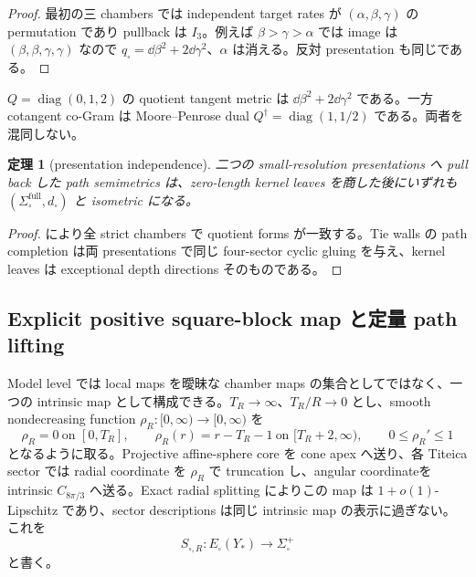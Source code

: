 \documentclass[11pt,a4paper]{ltjsarticle}
\newcommand{\Sigfull}{\Sigma_{\square}^{\mathrm{full}}}
\newcommand{\Sigplus}{\Sigma_{\square}^{+}}
\theoremstyle{plain}
\newtheorem{theorem}{定理}[section]\newtheorem{proposition}[theorem]{命題}
\theoremstyle{definition}
\theoremstyle{remark}
\begin{document}
\begin{proof}
最初の三 chambers では independent target rates が $(\alpha,\beta,\gamma)$ の permutation であり pullback は $I_3$。例えば $\beta>\gamma>\alpha$ では image は $(\beta,\beta,\gamma,\gamma)$ なので $q_{\square}=\dd\beta^2+2\dd\gamma^2$、$\alpha$ は消える。反対 presentation も同じである。
\end{proof}

\begin{warning}
$Q=\operatorname{diag}(0,1,2)$ の quotient tangent metric は $\dd\beta^2+2\dd\gamma^2$ である。一方 cotangent co-Gram は Moore--Penrose dual $Q^\dagger=\operatorname{diag}(1,1/2)$ である。両者を混同しない。
\end{warning}

\begin{theorem}[presentation independence]\label{thm:presentation-independence}
二つの small-resolution presentations へ pull back した path semimetrics は、zero-length kernel leaves を商した後にいずれも $(\Sigfull,d_{\square})$ と isometric になる。
\end{theorem}

\begin{proof}
 により全 strict chambers で quotient forms が一致する。Tie walls の path completion は両 presentations で同じ four-sector cyclic gluing を与え、kernel leaves は exceptional depth directions そのものである。
\end{proof}

\subsection{Explicit positive square-block map と定量 path lifting}
Model level では local maps を曖昧な chamber maps の集合としてではなく、一つの intrinsic map として構成できる。$T_R\to\infty$、$T_R/R\to0$ とし、smooth nondecreasing function $\rho_R:[0,\infty)\to[0,\infty)$ を
\[
 \rho_R=0\ \text{on }[0,T_R],
 \qquad
 \rho_R(r)=r-T_R-1\ \text{on }[T_R+2,\infty),
 \qquad
 0\le\rho_R'\le1
\]
となるように取る。Projective affine-sphere core を cone apex へ送り、各 Titeica sector では radial coordinate を $\rho_R$ で truncation し、angular coordinateを intrinsic $C_{8\pi/3}$ へ送る。Exact radial splitting によりこの map は $1+o(1)$-Lipschitz であり、sector descriptions は同じ intrinsic map の表示に過ぎない。これを
\[
 S_{\square,R}:E_{\square}(Y_*)\longrightarrow\Sigplus
\]
と書く。
\end{document}
